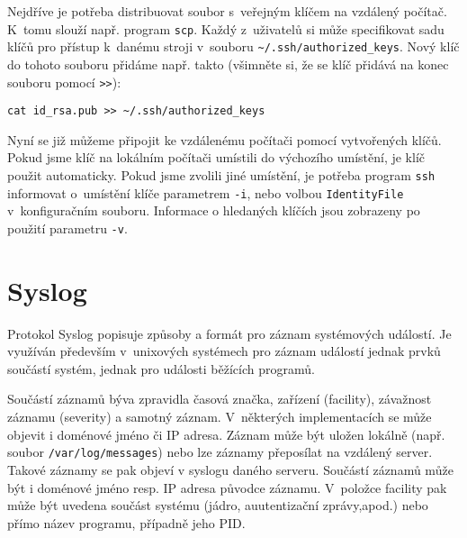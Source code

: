Nejdříve je potřeba distribuovat soubor s~veřejným klíčem na vzdálený počítač. K~tomu slouží
 např. program {\tt scp}. Každý z~uživatelů si může specifikovat sadu klíčů pro přístup k~danému
 stroji v~souboru \verb|~/.ssh/authorized_keys|. Nový klíč do tohoto souboru přidáme např. takto
 (všimněte si, že se klíč přidává na konec souboru pomocí \verb|>>|):

\begin{verbatim}
cat id_rsa.pub >> ~/.ssh/authorized_keys
\end{verbatim}

Nyní se již můžeme připojit ke vzdálenému počítači pomocí vytvořených klíčů. Pokud jsme klíč
 na lokálním počítači umístili do výchozího umístění, je klíč použit automaticky. Pokud jsme
 zvolili jiné umístění, je potřeba program {\tt ssh} informovat o~umístění klíče parametrem
 {\tt -i}, nebo volbou {\tt IdentityFile} v~konfiguračním souboru. Informace o hledaných
 klíčích jsou zobrazeny po použití parametru {\tt -v}.

\section{Syslog}
Protokol Syslog \cite{rfc5424} popisuje způsoby a formát pro záznam systémových událostí. Je využíván
 především v~unixových systémech pro záznam událostí jednak prvků součástí systém, jednak pro
 události běžících programů. 

Součástí záznamů býva zpravidla časová značka, zařízení (facility), závažnost záznamu (severity)
 a samotný záznam. V~některých implementacích se může objevit i doménové jméno či IP adresa. Záznam
 může být uložen lokálně (např. soubor \verb|/var/log/messages|) nebo lze záznamy přeposílat
 na vzdálený server. Takové záznamy se pak objeví v syslogu daného serveru. Součástí záznamů může být
 i doménové jméno resp. IP adresa původce záznamu. V~položce facility pak může být uvedena součást
 systému (jádro, auutentizační zprávy,apod.) nebo přímo název programu, případně jeho PID.

